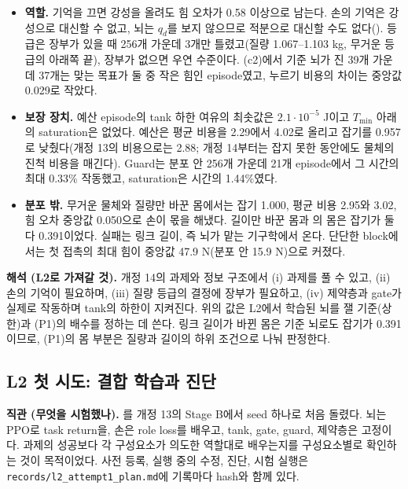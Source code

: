 \documentclass[11pt]{article}\usepackage[margin=1in]{geometry}\usepackage{amsmath,amssymb,amsthm,mathtools}\usepackage{graphicx}\graphicspath{{figures/}{../figures/}{figs/}{./}}\usepackage{enumitem}\usepackage{hyperref}\usepackage{cleveref}\usepackage{tikz}\usetikzlibrary{arrows.meta,positioning,calc,shapes.geometric}\usepackage{float}\usepackage{rotating}\usepackage[most]{tcolorbox}\usepackage{kotex}\usepackage{booktabs}\usepackage{longtable}\emergencystretch=1.6em\tolerance=2000 \crefname{assumption}{Assumption}{Assumptions}\Crefname{assumption}{Assumption}{Assumptions}\crefname{definition}{Definition}{Definitions}\Crefname{definition}{Definition}{Definitions}\crefname{proposition}{Proposition}{Propositions}\Crefname{proposition}{Proposition}{Propositions}\crefname{fact}{Fact}{Facts}\Crefname{fact}{Fact}{Facts} \newtheorem{assumption}{Assumption}\newtheorem{definition}{Definition}\newtheorem{lemma}{Lemma}\newtheorem{proposition}{Proposition}\newtheorem{theorem}{Theorem}\newtheorem{corollary}{Corollary}\newtheorem{fact}{Fact}\theoremstyle{remark}\newtheorem{remark}{Remark} \newcommand{\R}{\mathbb{R}}\newcommand{\xb}{\bar x}\newcommand{\Ab}{\bar A}\newcommand{\By}{\bar B_y}\newcommand{\U}{\mathcal U}\newcommand{\Z}{\mathcal Z}
\begin{document}
\begin{itemize}
\item \textbf{역할.} 기억을 끄면 강성을 올려도 힘 오차가 0.58 이상으로 남는다. 손의 기억은 강성으로 대신할 수 없고, 뇌는 $q_d$를 보지 않으므로 적분으로 대신할 수도 없다(). 등급은 장부가 있을 때 256개 가운데 3개만 틀렸고(질량 1.067--1.103 kg, 무거운 등급의 아래쪽 끝), 장부가 없으면 우연 수준이다. (c2)에서 기준 뇌가 진 39개 가운데 37개는 맞는 목표가 둘 중 작은 힘인 episode였고, 누르기 비용의 차이는 중앙값 0.029로 작았다.
\item \textbf{보장 장치.} 예산 episode의 tank 하한 여유의 최솟값은 $2.1\cdot10^{-5}$ J이고 $T_{\min}$ 아래의 saturation은 없었다. 예산은 평균 비용을 2.29에서 4.02로 올리고 잡기를 0.957로 낮췄다(개정 13의 비용으로는 2.88; 개정 14부터는 잡지 못한 동안에도 물체의 진척 비용을 매긴다). Guard는 분포 안 256개 가운데 21개 episode에서 그 시간의 최대 0.33\% 작동했고, saturation은 시간의 1.44\%였다.
\item \textbf{분포 밖.} 무거운 물체와 질량만 바꾼 몸에서는 잡기 1.000, 평균 비용 2.95와 3.02, 힘 오차 중앙값 0.050으로 손이 몫을 해냈다. 길이만 바꾼 몸과 의 몸은 잡기가 둘 다 0.391이었다. 실패는 링크 길이, 즉 뇌가 맡는 기구학에서 온다. 단단한 block에서는 첫 접촉의 최대 힘이 중앙값 47.9 N(분포 안 15.9 N)으로 커졌다.
\end{itemize}

\textbf{해석 (L2로 가져갈 것).} 개정 14의 과제와 정보 구조에서 (i) 과제를 풀 수 있고, (ii) 손의 기억이 필요하며, (iii) 질량 등급의 결정에 장부가 필요하고, (iv) 제약층과 gate가 실제로 작동하며 tank의 하한이 지켜진다. 위의 값은 L2에서 학습된 뇌를 잴 기준(상한)과 (P1)의 배수를 정하는 데 쓴다. 링크 길이가 바뀐 몸은 기준 뇌로도 잡기가 0.391이므로, (P1)의 몸 부분은 질량과 길이의 하위 조건으로 나눠 판정한다.

\subsection{L2 첫 시도: 결합 학습과 진단}
\label{sec:l2a1}

\textbf{직관 (무엇을 시험했나).} 를 개정 13의 Stage B에서 seed 하나로 처음 돌렸다. 뇌는 PPO로 task return을, 손은 role loss를 배우고, tank, gate, guard, 제약층은 고정이다. 과제의 성공보다 각 구성요소가 의도한 역할대로 배우는지를 구성요소별로 확인하는 것이 목적이었다. 사전 등록, 실행 중의 수정, 진단, 시험 실행은 \texttt{records/l2\_attempt1\_plan.md}에 기록마다 hash와 함께 있다.
\end{document}
